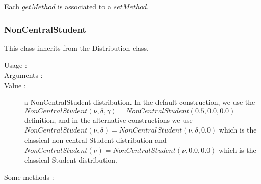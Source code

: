 Each  $getMethod$  is associated to a $setMethod$.

\newpage \subsubsection{NonCentralStudent}

This class inherits from the Distribution class.

\begin{description}

\item[Usage :] \rule{0pt}{1em}

\item[Arguments :]  \rule{0pt}{1em}

\item[Value :] a NonCentralStudent distribution. In the default construction, we use the $NonCentralStudent(\nu, \delta, \gamma) = NonCentralStudent(0.5, 0.0, 0.0)$ definition, and in the alternative constructions we use $NonCentralStudent(\nu, \delta) = NonCentralStudent(\nu, \delta, 0.0)$ which is the classical non-central Student distribution and $NonCentralStudent(\nu) = NonCentralStudent(\nu, 0.0, 0.0)$ which is the classical Student distribution.

\item[Some methods :] \rule{0pt}{1em}
  \begin{description}


\end{description}
\end{description}
